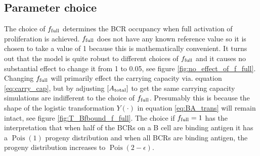 
\subsection{Parameter choice}
The choice of $f_{\text{full}}$ determines the BCR occupancy when full activation of proliferation is achieved.
$f_{\text{full}}$ does not have any known reference value so it is chosen to take a value of 1 because this is mathematically convenient.
It turns out that the model is quite robust to different choices of $f_{\text{full}}$ and it causes no substantial effect to change it from 1 to 0.05, see figure \ref{fig:no_effect_of_f_full}.
Changing $f_{\text{full}}$ will primarily effect the carrying capacity via. equation \ref{eq:carry_cap}, but by adjusting $[A_{\text{total}}]$ to get the same carrying capacity simulations are indifferent to the choice of $f_{\text{full}}$.
Presumably this is because the shape of the logistic transformation $Y(\cdot)$ in equation \ref{eq:BA_trans} will remain intact, see figure \ref{fig:T_Bfbound_f_full}.
The choice if $f_{\text{full}} = 1$ has the interpretation that when half of the BCRs on a B cell are binding antigen it has a $\operatorname{Pois}(1)$ progeny distribution and when all BCRs are binding antigen, the progeny distribution increases to $\operatorname{Pois}(2-\epsilon)$.

